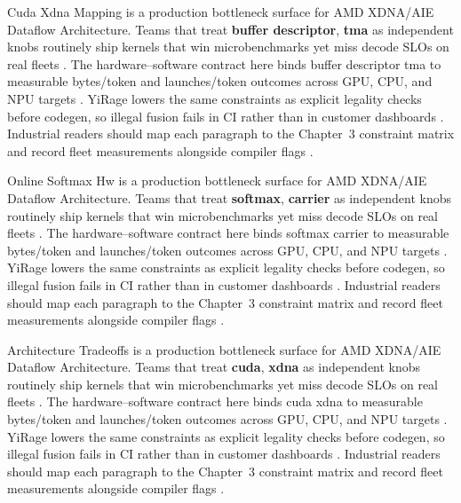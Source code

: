 Cuda Xdna Mapping is a production bottleneck surface for AMD XDNA/AIE Dataflow Architecture. Teams that treat \textbf{buffer descriptor}, \textbf{tma} as independent knobs routinely ship kernels that win microbenchmarks yet miss decode SLOs on real fleets \citep{dao2022flashattention,liu2024deepseekv3}. The hardware--software contract here binds buffer descriptor tma to measurable bytes/token and launches/token outcomes across GPU, CPU, and NPU targets \citep{kwon2023vllm,patel2025llminference}. YiRage lowers the same constraints as explicit legality checks before codegen, so illegal fusion fails in CI rather than in customer dashboards \citep{nvidia2024cudagraphs,taxbreak2026}. Industrial readers should map each paragraph to the Chapter~3 constraint matrix and record fleet measurements alongside compiler flags \citep{liu2024deepseekv3,memoryfloor2026}.

Online Softmax Hw is a production bottleneck surface for AMD XDNA/AIE Dataflow Architecture. Teams that treat \textbf{softmax}, \textbf{carrier} as independent knobs routinely ship kernels that win microbenchmarks yet miss decode SLOs on real fleets \citep{kwon2023vllm,patel2025llminference}. The hardware--software contract here binds softmax carrier to measurable bytes/token and launches/token outcomes across GPU, CPU, and NPU targets \citep{nvidia2024cudagraphs,taxbreak2026}. YiRage lowers the same constraints as explicit legality checks before codegen, so illegal fusion fails in CI rather than in customer dashboards \citep{liu2024deepseekv3,memoryfloor2026}. Industrial readers should map each paragraph to the Chapter~3 constraint matrix and record fleet measurements alongside compiler flags \citep{patel2025llminference,nvidia2022hopper}.

Architecture Tradeoffs is a production bottleneck surface for AMD XDNA/AIE Dataflow Architecture. Teams that treat \textbf{cuda}, \textbf{xdna} as independent knobs routinely ship kernels that win microbenchmarks yet miss decode SLOs on real fleets \citep{nvidia2024cudagraphs,taxbreak2026}. The hardware--software contract here binds cuda xdna to measurable bytes/token and launches/token outcomes across GPU, CPU, and NPU targets \citep{liu2024deepseekv3,memoryfloor2026}. YiRage lowers the same constraints as explicit legality checks before codegen, so illegal fusion fails in CI rather than in customer dashboards \citep{patel2025llminference,nvidia2022hopper}. Industrial readers should map each paragraph to the Chapter~3 constraint matrix and record fleet measurements alongside compiler flags \citep{taxbreak2026,semianalysis2024tma}.

